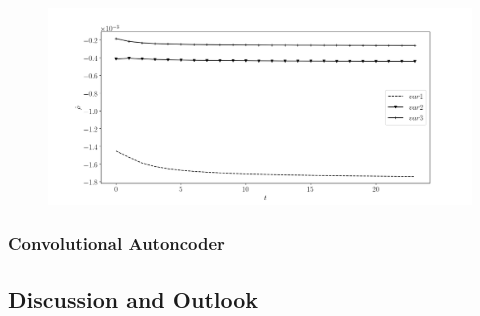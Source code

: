\documentclass[12pt, a4paper]{article}
\begin{document}
\begin{figure}
	\includegraphics[width=\linewidth]{Figures/02_12_20/kn0p00001Conservative_Quantities/code/Consrvative_Rho_Code.png}
\end{figure}
\subsubsection{Convolutional Autoncoder}



\subsection{Discussion and Outlook}
{}

\end{document}
